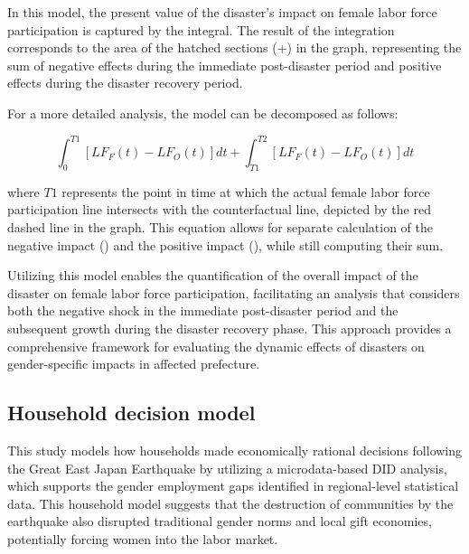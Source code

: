 \documentclass[12pt,halfline,a4paper]{ouparticle}
\begin{document}
In this model, the present value of the disaster's impact on female labor force participation is captured by the integral. The result of the integration corresponds to the area of the hatched sections (+) in the graph, representing the sum of negative effects during the immediate post-disaster period and positive effects during the disaster recovery period.

For a more detailed analysis, the model can be decomposed as follows:

\begin{equation}
\int_0^{T1} [LF_F(t) - LF_O(t)] dt + \int_{T1}^{T2} [LF_F(t) - LF_O(t)] dt
\end{equation}

where $T1$ represents the point in time at which the actual female labor force participation line intersects with the counterfactual line, depicted by the red dashed line in the graph. This equation allows for separate calculation of the negative impact () and the positive impact (), while still computing their sum.

Utilizing this model enables the quantification of the overall impact of the disaster on female labor force participation, facilitating an analysis that considers both the negative shock in the immediate post-disaster period and the subsequent growth during the disaster recovery phase. This approach provides a comprehensive framework for evaluating the dynamic effects of disasters on gender-specific impacts in affected prefecture.


\subsection{Household decision model}
\label{sec5.1}

This study models how households made economically rational decisions following the Great East Japan Earthquake by utilizing a microdata-based DID analysis, which supports the gender employment gaps identified in regional-level statistical data. This household model suggests that the destruction of communities by the earthquake also disrupted traditional gender norms and local gift economies, potentially forcing women into the labor market.
\end{document}
